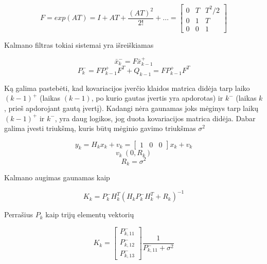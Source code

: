 \documentclass[12pt, a4paper, lithuanian]{article}
\begin{document}
        \begin{equation}
            F = exp(AT) = I + AT + \frac{(AT)^2}{2!} + \dots =
            \begin{bmatrix}
                0 & T & T^2/2 \\
                0 & 1 & T \\ 
                0 & 0 & 1
            \end{bmatrix}
        \end{equation}

        Kalmano filtras tokiai sistemai yra išreiškiamas

        \begin{equation}
            \bar{x}_k^- = F\bar{x}_{k-1}^+
        \end{equation}
        \begin{equation}
            P_k^- = FP_{k-1}^+ F^T + Q_{k-1} = FP_{k-1}^+ F^T
        \end{equation}

        Ką galima pastebėti, kad kovariacijos įverčio klaidos matrica didėja tarp laiko $(k-1)^+$ (laikas $(k-1)$, po kurio gautas įvertis yra apdorotas) ir $k^-$ (laikas $k$, prieš apdorojant gautą įvertį).
        Kadangi nėra gaunamas joks mėginys tarp laikų $(k-1)^+$ ir $k^-$, yra daug logikos, jog duota kovariacijos matrica didėja.
        Dabar galima įvesti triukšmą, kuris būtų mėginio gavimo triukšmas $\sigma^2$

        \begin{equation}
            y_k = H_kx_k + v_k = \begin{bmatrix} 1 & 0 & 0 \end{bmatrix} x_k + v_k
        \end{equation}
        \begin{equation}
            v_k ~ (0, R_k)
        \end{equation}
        \begin{equation}
            R_k = \sigma^2
        \end{equation}

        Kalmano augimas gaunamas kaip

        \begin{equation}
            K_k = P_k^-H_k^T(H_kP_k^-H_k^T+R_k)^{-1}
        \end{equation}

        Perrašius $P_k$ kaip trijų elementų vektorių

        \begin{equation}
            K_k = \begin{bmatrix} P_{k,11}^- \\ P_{k,12}^- \\ P_{k,13}^- \end{bmatrix} \frac{1}{P_{k,11}^- + \sigma^2}
        \end{equation}
\end{document}
